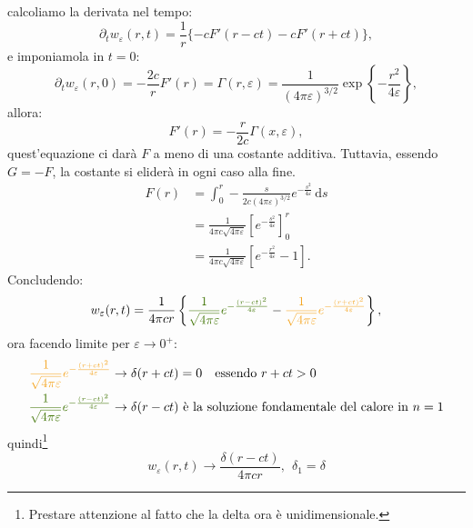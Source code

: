 \documentclass[10pt,a4paper,twoside,openright]{book}
\newcommand{\de}{\,\mathrm d}
\newcommand{\ds}{\de s}
\begin{document}
calcoliamo la derivata nel tempo:
\begin{equation*}
    \partial _{t} w_{\varepsilon }(r,t) =\frac{1}{r}\{-cF'(r-ct) -cF'(r+ct)\} ,
\end{equation*}
e imponiamola in $t=0$:
\begin{equation*}
    \partial _{t} w_{\varepsilon }(r,0) =-\frac{2c}{r} F'(r) =\Gamma (r,\varepsilon) =\frac{1}{(4\pi \varepsilon)^{3/2}}\exp\left\{-\frac{r^{2}}{4\varepsilon }\right\} ,
\end{equation*}
allora:
\begin{equation*}
    F'(r) =-\frac{r}{2c} \Gamma (x,\varepsilon) ,
\end{equation*}
quest'equazione ci darà $F$ a meno di una costante additiva. Tuttavia, essendo $G=-F$, la costante si eliderà in ogni caso alla fine.
\begin{align*}
    F(r) & =\int _{0}^{r} -\frac{s}{2c(4\pi \varepsilon)^{3/2}} e^{-\frac{s^{2}}{4\varepsilon }} \ds       \\
         & =\frac{1}{4\pi c\sqrt{4\pi \varepsilon }}\left[ e^{-\frac{s^{2}}{4\varepsilon }}\right]_{0}^{r} \\
         & =\frac{1}{4\pi c\sqrt{4\pi \varepsilon }}\left[ e^{-\frac{r^{2}}{4\varepsilon }} -1\right] .
\end{align*}
Concludendo:
\begin{equation*}
    w_{\varepsilon }(r,t) =\frac{1}{4\pi cr}\left\{\textcolor[rgb]{0.25,0.46,0.02}{\frac{1}{\sqrt{4\pi \varepsilon }}e^{-\frac{(r-ct)^{2}}{4\varepsilon}}} -\textcolor[rgb]{0.96,0.65,0.14}{\frac{1}{\sqrt{4\pi \varepsilon }}e^{-\frac{(r+ct)^{2}}{4\varepsilon}}}\right\} ,
\end{equation*}
ora facendo limite per $\displaystyle \varepsilon \rightarrow 0^{+}$:
\begin{align*}
    \textcolor[rgb]{0.96,0.65,0.14}{\frac{1}{\sqrt{4\pi \varepsilon }}e^{-\frac{(r+ct)^{2}}{4\varepsilon}}} & \rightarrow \delta (r+ct)=0 \quad \text{essendo} \ r+ct>0                        \\
    \textcolor[rgb]{0.25,0.46,0.02}{\frac{1}{\sqrt{4\pi \varepsilon }}e^{-\frac{(r-ct)^{2}}{4\varepsilon}}} & \rightarrow \delta (r-ct)\ \text{è la soluzione fondamentale del calore in}\ n=1
\end{align*}
quindi\footnote{Prestare attenzione al fatto che la delta ora è unidimensionale.}
\begin{equation*}
    w_{\varepsilon }(r,t)\rightarrow \frac{\delta (r-ct)}{4\pi cr} ,\ \ \delta _{1} =\delta
\end{equation*}
\end{document}
